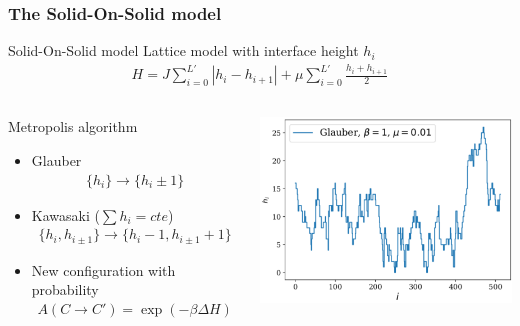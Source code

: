 \documentclass[9pt, dvipsnames,aspectratio=169]{beamer} %
\begin{document}
\begin{frame}
    \frametitle{The Solid-On-Solid model}
    \begin{block}{Solid-On-Solid model}
    	Lattice model with interface height $h_i$
    	\begin{align}
	    	H = J \sum_{i=0}^{L'} |h_i-h_{i+1}| + \mu \sum_{i=0}^{L'} \frac{h_i+h_{i+1}}{2}
    	\end{align}
    \end{block}
    \begin{columns}
	\begin{block}{Metropolis algorithm}
		\begin{itemize}
			\item Glauber 
			\begin{align}
				\{h_i\} \to  \{h_i \pm 1\} 
			\end{align}
			\item Kawasaki ($\sum h_i = cte$)
			\begin{align}
				\{h_i,h_{i\pm 1} \} \to \{h_i-1,h_{i \pm 1}+1\} 
			\end{align}			
			\item New configuration with probability 
			\begin{align}A(C\to C') = \exp(-\beta \Delta H)
			\end{align}
		\end{itemize}
	\end{block}
    \centering
	\includegraphics[scale=0.4]{snap-sos.pdf}
    \end{columns}
\end{frame}
\end{document}
